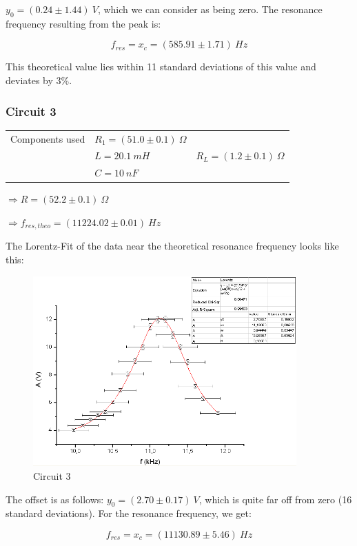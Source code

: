 $y_0 = (0.24 \pm 1.44)\ V$, which we can consider as being zero. The resonance frequency resulting from the peak is: 

$$\boxed{ f_{res} = x_c = (585.91 \pm 1.71)\ Hz}$$

This theoretical value lies within 11 standard deviations of this value and deviates by 3\%.


\subsubsection{Circuit 3}

\begin{tabular}{l l l}
Components used & $R_1 = (51.0 \pm 0.1)\ \Omega$ & \\
 & $L=20.1\ mH$ & $R_L = (1.2 \pm 0.1)\ \Omega$\\
 & $C=10\ nF$ & \\
\end{tabular}

$\Rightarrow R = (52.2 \pm 0.1)\ \Omega$

$\Rightarrow f_{res,theo} = (11224.02 \pm 0.01)\ Hz$

The Lorentz-Fit of the data near the theoretical resonance frequency looks like this:

\begin{figure}[H]
\centering \includegraphics[width=0.9\textwidth]{Bilder/1c.png}
\caption{Circuit 3}
\end{figure}

The offset is as follows: $y_0 = (2.70 \pm 0.17)\ V$, which is quite far off from zero (16 standard deviations). For the resonance frequency, we get:

$$\boxed{ f_{res} = x_c = ( 11130.89 \pm 5.46)\ Hz}$$

